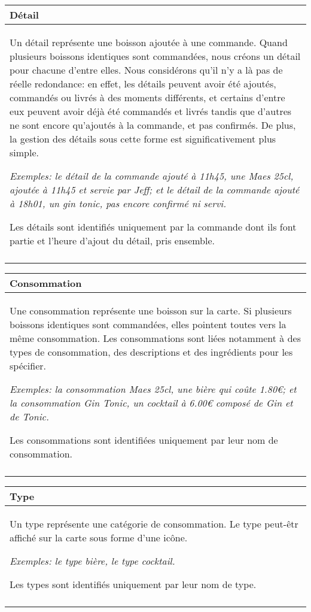 \documentclass[a4paper,10pt]{article}
\begin{document}
\begin{tabu}{X}
\textbf{Détail} \\
\toprule

Un détail représente une boisson ajoutée à une commande. Quand plusieurs boissons identiques sont commandées, nous créons un détail pour chacune d'entre elles. Nous considérons qu'il n'y a là pas de réelle redondance: en effet, les détails peuvent avoir été ajoutés, commandés ou livrés à des moments différents, et certains d'entre eux peuvent avoir déjà été commandés et livrés tandis que d'autres ne sont encore qu'ajoutés à la commande, et pas confirmés. De plus, la gestion des détails sous cette forme est significativement plus simple.

\textsl{Exemples: le détail de la commande  ajouté à 11h45, une Maes 25cl, ajoutée à 11h45 et servie par Jeff; et le détail de la commande  ajouté à 18h01, un gin tonic, pas encore confirmé ni servi.}

Les détails sont identifiés uniquement par la commande dont ils font partie et l'heure d'ajout du détail, pris ensemble. \\\\
\end{tabu}

\begin{tabu}{X}
\textbf{Consommation} \\
\toprule

Une consommation représente une boisson sur la carte. Si plusieurs boissons identiques sont commandées, elles pointent toutes vers la même consommation. Les consommations sont liées notamment à des types de consommation, des descriptions et des ingrédients pour les spécifier.
    
\textsl{Exemples: la consommation Maes 25cl, une bière qui coûte 1.80€; et la consommation Gin Tonic, un cocktail à 6.00€ composé de Gin et de Tonic.}

Les consommations sont identifiées uniquement par leur nom de consommation. \\\\
\end{tabu}

\begin{tabu}{X}
\textbf{Type} \\
\toprule

Un type représente une catégorie de consommation. Le type peut-êtr affiché sur la carte sous forme d'une icône.

\textsl{Exemples: le type bière, le type cocktail.}

Les types sont identifiés uniquement par leur nom de type. \\\\
\end{tabu}
\end{document}
